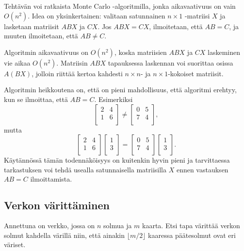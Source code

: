 Tehtävän voi ratkaista Monte Carlo -algoritmilla,
jonka aikavaativuus on vain $O(n^2)$.
Idea on yksinkertainen: valitaan satunnainen
$n \times 1$ -matriisi $X$ ja lasketaan
matriisit $ABX$ ja $CX$.
Jos $ABX=CX$, ilmoitetaan, että $AB=C$,
ja muuten ilmoitetaan, että $AB \neq C$.

Algoritmin aikavaativuus on $O(n^2)$,
koska matriisien $ABX$ ja $CX$ laskeminen
vie aikaa $O(n^2)$.
Matriisin $ABX$ tapauksessa laskennan
voi suorittaa osissa $A(BX)$, jolloin riittää
kertoa kahdesti $n \times n$- ja $n \times 1$-kokoiset
matriisit.

Algoritmin heikkoutena on, että on pieni mahdollisuus,
että algoritmi erehtyy, kun se ilmoittaa, että $AB=C$.
Esimerkiksi 
\[
 \begin{bmatrix}
  2 & 4 \\
  1 & 6 \\
 \end{bmatrix}
\neq
 \begin{bmatrix}
  0 & 5 \\
  7 & 4 \\
 \end{bmatrix},
\]
mutta
\[
 \begin{bmatrix}
  2 & 4 \\
  1 & 6 \\
 \end{bmatrix}
 \begin{bmatrix}
  1 \\
  3 \\
 \end{bmatrix}
=
 \begin{bmatrix}
  0 & 5 \\
  7 & 4 \\
 \end{bmatrix}
 \begin{bmatrix}
  1 \\
  3 \\
 \end{bmatrix}.
\]
Käytännössä tämän todennäköisyys on kuitenkin hyvin
pieni ja tarvittaessa tarkastuksen voi tehdä usealla
satunnaisella matriisilla $X$ ennen vastauksen
$AB=C$ ilmoittamista.

\subsection{Verkon värittäminen}

\begin{task}
Annettuna on verkko, jossa on $n$ solmua ja $m$ kaarta.
Etsi tapa värittää verkon solmut kahdella värillä
niin, että ainakin $\lfloor m/2 \rfloor$ kaaressa
päätesolmut ovat eri väriset.
\end{task}

